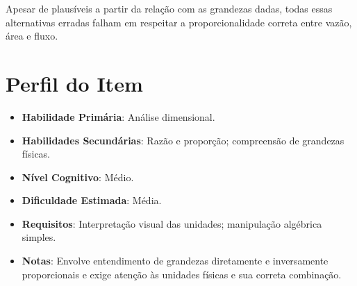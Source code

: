 \documentclass{article}
\begin{document}
Apesar de plausíveis a partir da relação com as grandezas dadas, todas essas alternativas erradas falham em respeitar a proporcionalidade correta entre vazão, área e fluxo.

\section{Perfil do Item}

\begin{itemize}
  \item \textbf{Habilidade Primária}: Análise dimensional.
  \item \textbf{Habilidades Secundárias}: Razão e proporção; compreensão de grandezas físicas.
  \item \textbf{Nível Cognitivo}: Médio.
  \item \textbf{Dificuldade Estimada}: Média.
  \item \textbf{Requisitos}: Interpretação visual das unidades; manipulação algébrica simples.
  \item \textbf{Notas}: Envolve entendimento de grandezas diretamente e inversamente proporcionais e exige atenção às unidades físicas e sua correta combinação.
\end{itemize}
\end{document}
